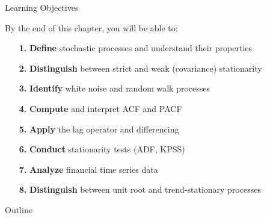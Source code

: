 \documentclass[9pt, aspectratio=169, t]{beamer}
\subtitle{Chapter 1: Stochastic Processes and Stationarity}
\begin{document}
{
\begin{frame}
    \titlepage
\end{frame}
}

\begin{frame}{Learning Objectives}
    \begin{block}{By the end of this chapter, you will be able to:}
    \begin{enumerate}\setlength{\itemsep}{0pt}
        \item[\textcolor{MainBlue}{\textbf{1.}}] \textbf{Define} stochastic processes and understand their properties
        \item[\textcolor{MainBlue}{\textbf{2.}}] \textbf{Distinguish} between strict and weak (covariance) stationarity
        \item[\textcolor{MainBlue}{\textbf{3.}}] \textbf{Identify} white noise and random walk processes
        \item[\textcolor{MainBlue}{\textbf{4.}}] \textbf{Compute} and interpret ACF and PACF
        \item[\textcolor{MainBlue}{\textbf{5.}}] \textbf{Apply} the lag operator and differencing
        \item[\textcolor{MainBlue}{\textbf{6.}}] \textbf{Conduct} stationarity tests (ADF, KPSS)
        \item[\textcolor{MainBlue}{\textbf{7.}}] \textbf{Analyze} financial time series data
        \item[\textcolor{MainBlue}{\textbf{8.}}] \textbf{Distinguish} between unit root and trend-stationary processes
    \end{enumerate}
    \end{block}
\end{frame}

\begin{frame}{Outline}
    \tableofcontents
\end{frame}

\end{document}
